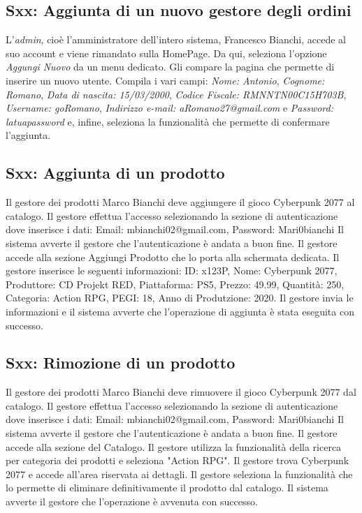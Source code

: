 \documentclass[12pt, a4paper, oneside]{book}
\begin{document}
    \subsection*{Sxx: Aggiunta di un nuovo gestore degli ordini}
    L'\textit{admin}, cioè l'amministratore dell'intero sistema, Francesco Bianchi, accede al suo account e viene rimandato sulla HomePage. Da qui, seleziona l'opzione \textit{Aggungi Nuovo} da un menu dedicato. Gli compare la pagina che permette di inserire un nuovo utente. Compila i vari campi: \textit{Nome: Antonio}, \textit{Cognome: Romano}, \textit{Data di nascita: 15/03/2000}, \textit{Codice Fiscale: RMNNTN00C15H703B}, \textit{Username: goRomano}, \textit{Indirizzo e-mail: aRomano27@gmail.com} e \textit{Password: latuapassword} e, infine, seleziona la funzionalità che permette di confermare l'aggiunta.

    \subsection*{Sxx: Aggiunta di un prodotto}
    Il gestore dei prodotti Marco Bianchi deve aggiungere il gioco Cyberpunk 2077 al catalogo. Il gestore
    effettua l'accesso selezionando la sezione di autenticazione dove inserisce i dati: Email: mbianchi02@gmail.com, Password: Mari0bianchi
    Il sistema avverte il gestore che l'autenticazione è andata a buon fine. Il gestore accede alla sezione
    Aggiungi Prodotto che lo porta alla schermata dedicata. Il gestore inserisce le seguenti informazioni:
    ID: x123P, Nome: Cyberpunk 2077, Produttore: CD Projekt RED, Piattaforma: PS5, Prezzo: 49.99, Quantità: 250,
    Categoria: Action RPG, PEGI: 18, Anno di Produtzione: 2020. Il gestore invia le informazioni
    e il sistema avverte che l'operazione di aggiunta è stata eseguita con successo.

    \subsection*{Sxx: Rimozione di un prodotto}
    Il gestore dei prodotti Marco Bianchi deve rimuovere il gioco Cyberpunk 2077 dal catalogo.
    Il gestore effettua l'accesso selezionando la sezione di autenticazione dove inserisce i dati: Email: mbianchi02@gmail.com, Password: Mari0bianchi
    Il sistema avverte il gestore che l'autenticazione è andata a buon fine. Il gestore accede alla sezione del Catalogo.
    Il gestore utilizza la funzionalità della ricerca per categoria dei prodotti e seleziona "Action RPG". Il gestore
    trova Cyberpunk 2077 e accede all'area riservata ai dettagli. Il gestore seleziona la funzionalità che lo
    permette di eliminare definitivamente il prodotto dal catalogo. Il sistema avverte il gestore che l'operazione è avvenuta con successo.
\end{document}
